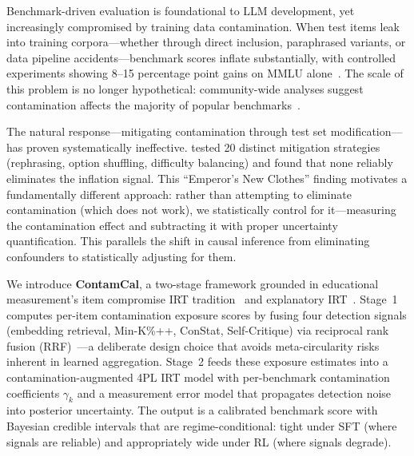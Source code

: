 \documentclass[letterpaper]{article}
\begin{document}
Benchmark-driven evaluation is foundational to LLM development, yet increasingly compromised by training data contamination.
When test items leak into training corpora---whether through direct inclusion, paraphrased variants, or data pipeline accidents---benchmark scores inflate substantially, with controlled experiments showing 8--15 percentage point gains on MMLU alone~\citep{yang2023rethinking,oren2024proving}.
The scale of this problem is no longer hypothetical: community-wide analyses suggest contamination affects the majority of popular benchmarks~\citep{deng2024investigating,balloccu2024leak}.

The natural response---mitigating contamination through test set modification---has proven systematically ineffective.
\citet{xu2024benchmarking} tested 20 distinct mitigation strategies (rephrasing, option shuffling, difficulty balancing) and found that none reliably eliminates the inflation signal.
This ``Emperor's New Clothes'' finding motivates a fundamentally different approach: rather than attempting to eliminate contamination (which does not work), we statistically control for it---measuring the contamination effect and subtracting it with proper uncertainty quantification.
This parallels the shift in causal inference from eliminating confounders to statistically adjusting for them.

We introduce \textbf{ContamCal}, a two-stage framework grounded in educational measurement's item compromise IRT tradition~\citep{eckerly2017detecting,sinharay2017assessing} and explanatory IRT~\citep{deboeck2004explanatory}.
Stage~1 computes per-item contamination exposure scores by fusing four detection signals (embedding retrieval, Min-K\%++, ConStat, Self-Critique) via reciprocal rank fusion (RRF)~\citep{cormack2009reciprocal}---a deliberate design choice that avoids meta-circularity risks inherent in learned aggregation.
Stage~2 feeds these exposure estimates into a contamination-augmented 4PL IRT model with per-benchmark contamination coefficients $\gamma_k$ and a measurement error model that propagates detection noise into posterior uncertainty.
The output is a calibrated benchmark score with Bayesian credible intervals that are regime-conditional: tight under SFT (where signals are reliable) and appropriately wide under RL (where signals degrade).
\end{document}
